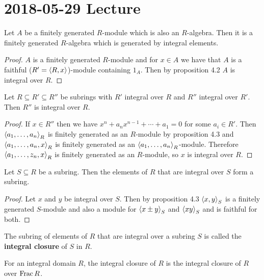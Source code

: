 \section{2018-05-29 Lecture}

\begin{prop}[4.4]
  Let $A$ be a finitely generated $R$-module which is also an $R$-algebra.
  Then it is a finitely generated $R$-algebra which is generated by integral elements.
\end{prop}

\begin{proof}
  $A$ is a finitely generated $R$-module and for $x \in A$ we have that $A$ is a faithful ($R'={\left\langle R,x \right\rangle}$)-module containing $1_A$.
  Then by proposition 4.2 $A$ is integral over $R$.
\end{proof}

\begin{prop}[4.5]
  Let $R \subseteq R' \subseteq R''$ be subrings with $R'$ integral over $R$ and $R''$ integral over $R'$.
  Then $R''$ is integral over $R$.
\end{prop}

\begin{proof}
  If $x \in R''$ then we have $x^n+a_nx^{n-1}+\cdots+a_1=0$ for some $a_i \in R'$.
  Then ${\left\langle a_1,\ldots,a_n \right\rangle}_R$ is finitely generated as an $R$-module by proposition 4.3 and ${\left\langle a_1,\ldots,a_n,x \right\rangle}_R$ is finitely generated as an ${\left\langle a_1,\ldots,a_n \right\rangle}_R$-module.
  Therefore ${\left\langle a_1,\ldots,z_n,x \right\rangle}_R$ is finitely generated as an $R$-module, so $x$ is integral over $R$.
\end{proof}

\begin{prop}[4.6]
  Let $S \subseteq R$ be a subring.
  Then the elements of $R$ that are integral over $S$ form a subring.
\end{prop}

\begin{proof}
  Let $x$ and $y$ be integral over $S$.
  Then by proposition 4.3 ${\left\langle x,y \right\rangle}_S$ is a finitely generated $S$-module and also a module for ${\left\langle x \pm y \right\rangle}_S$ and ${\left\langle xy \right\rangle}_S$ and is faithful for both.
\end{proof}

\begin{defn}[4.7]
  The subring of elements of $R$ that are integral over a subring $S$ is called the \textbf{integral closure} of $S$ in $R$.
\end{defn}

\begin{rmk}
  For an integral domain $R$, the integral closure of $R$ is the integral closure of $R$ over $\operatorname{Frac} R$.
\end{rmk}

